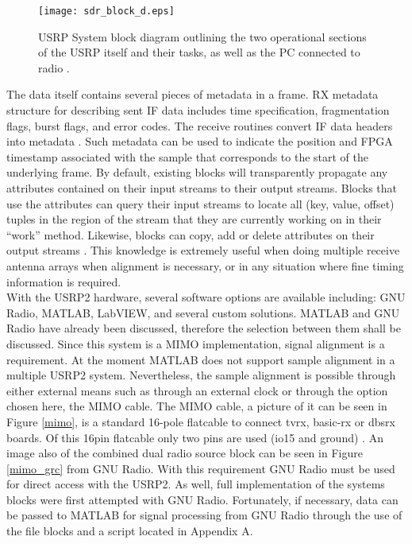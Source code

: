 \begin{figure}[!ht]
\centering
\texttt{[image: sdr\_block\_d.eps]}
\caption{USRP System block diagram outlining the two operational sections of the USRP itself and their tasks, as well as the PC connected to radio \cite{sdr_blocks}.}
\end{figure}

The data itself contains several pieces of metadata in a frame.  RX metadata structure for describing sent IF data includes time specification, fragmentation flags, burst flags, and error codes. The receive routines convert IF data headers into metadata \cite{metadata}.  Such metadata can be used to indicate the position and FPGA timestamp associated with the sample that corresponds to the start of the underlying frame. By default, existing blocks will transparently propagate any attributes contained on their input streams to their output streams. Blocks that use the attributes can query their input streams to locate all (key, value, offset) tuples in the region of the stream that they are currently working on in their ``work'' method. Likewise, blocks can copy, add or delete attributes on their output streams \cite{sdr_blog}.  This knowledge is extremely useful when doing multiple receive antenna arrays when alignment is necessary, or in any situation where fine timing information is required.\\

With the USRP2 hardware, several software options are available including: GNU Radio, MATLAB, LabVIEW, and several custom solutions.  MATLAB and GNU Radio have already been discussed, therefore the selection between them shall be discussed.  Since this system is a MIMO implementation, signal alignment is a requirement.  At the moment MATLAB does not support sample alignment in a multiple USRP2 system.  Nevertheless, the sample alignment is possible through either external means such as through an external clock or through the option chosen here, the MIMO cable.  The MIMO cable, a picture of it can be seen in Figure \ref{mimo}, is a standard 16-pole flatcable to connect tvrx, basic-rx or dbsrx boards.  Of this 16pin flatcable only two pins are used (io15 and ground) \cite{mimo_cable}.  An image also of the combined dual radio source block can be seen in Figure \ref{mimo_grc} from GNU Radio.  With this requirement GNU Radio must be used for direct access with the USRP2.  As well, full implementation of the systems blocks were first attempted with GNU Radio.  Fortunately, if necessary, data can be passed to MATLAB for signal processing from GNU Radio through the use of the file blocks and a script located in Appendix A.\\

